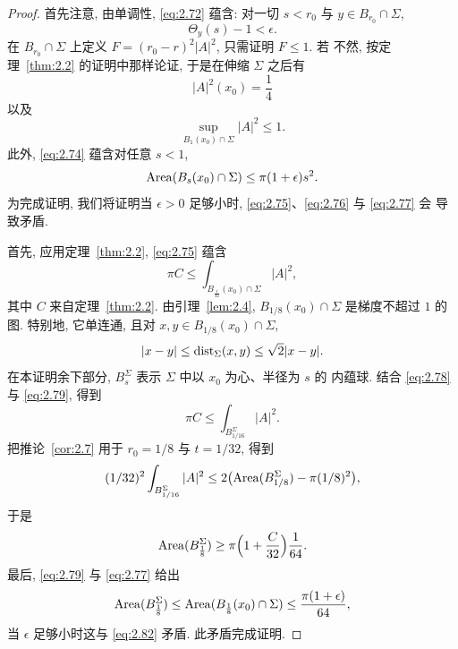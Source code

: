 \begin{proof}
首先注意, 由单调性, \eqref{eq:2.72} 蕴含: 对一切 $s<r_0$ 与 $y\in B_{r_0}\cap\Sigma$,
\begin{equation}
\Theta_y(s)-1<\epsilon.
\label{eq:2.74}
\end{equation}
在 $B_{r_0}\cap\Sigma$ 上定义 $F=(r_0-r)^{2}|A|^{2}$, 只需证明 $F\leq1$. 若
不然, 按定理~\ref{thm:2.2} 的证明中那样论证, 于是在伸缩 $\Sigma$ 之后有
\begin{equation}
|A|^{2}(x_0)=\frac14
\label{eq:2.75}
\end{equation}
以及
\begin{equation}
\sup_{B_1(x_0)\cap\Sigma}|A|^{2}\leq1.
\label{eq:2.76}
\end{equation}
此外, \eqref{eq:2.74} 蕴含对任意 $s<1$,
\begin{equation}
\operatorname{Area}(B_s(x_0)\cap\Sigma)\leq\pi(1+\epsilon)s^{2}.
\label{eq:2.77}
\end{equation}
为完成证明, 我们将证明当 $\epsilon>0$ 足够小时, \eqref{eq:2.75}、\eqref{eq:2.76} 与 \eqref{eq:2.77} 会
导致矛盾.

首先, 应用定理~\ref{thm:2.2}, \eqref{eq:2.75} 蕴含
\begin{equation}
\pi C\leq\int_{B_{\frac{1}{32}}(x_0)\cap\Sigma}|A|^{2},
\label{eq:2.78}
\end{equation}
其中 $C$ 来自定理~\ref{thm:2.2}. 由引理~\ref{lem:2.4}, $B_{1/8}(x_0)\cap\Sigma$
是梯度不超过 $1$ 的图. 特别地, 它单连通, 且对 $x,y\in B_{1/8}(x_0)\cap\Sigma$,
\begin{equation}
|x-y|\leq\operatorname{dist}_{\Sigma}(x,y)\leq\sqrt{2}|x-y|.
\label{eq:2.79}
\end{equation}
在本证明余下部分, $B_s^{\Sigma}$ 表示 $\Sigma$ 中以 $x_0$ 为心、半径为 $s$ 的
内蕴球. 结合 \eqref{eq:2.78} 与 \eqref{eq:2.79}, 得到
\begin{equation}
\pi C\leq\int_{B_{1/16}^{\Sigma}}|A|^{2}.
\label{eq:2.80}
\end{equation}
把推论~\ref{cor:2.7} 用于 $r_0=1/8$ 与 $t=1/32$, 得到
\begin{equation}
(1/32)^{2}\int_{B_{1/16}^{\Sigma}}|A|^{2}
 \leq2\bigl(\operatorname{Area}(B_{1/8}^{\Sigma})-\pi(1/8)^{2}\bigr),
\label{eq:2.81}
\end{equation}
于是
\begin{equation}
\operatorname{Area}(B_{\frac18}^{\Sigma})\geq\pi\Bigl(1+\frac{C}{32}\Bigr)\frac{1}{64}.
\label{eq:2.82}
\end{equation}
最后, \eqref{eq:2.79} 与 \eqref{eq:2.77} 给出
\begin{equation}
\operatorname{Area}(B_{\frac18}^{\Sigma})
 \leq\operatorname{Area}(B_{\frac18}(x_0)\cap\Sigma)\leq\frac{\pi(1+\epsilon)}{64},
\label{eq:2.83}
\end{equation}
当 $\epsilon$ 足够小时这与 \eqref{eq:2.82} 矛盾. 此矛盾完成证明.
\end{proof}


